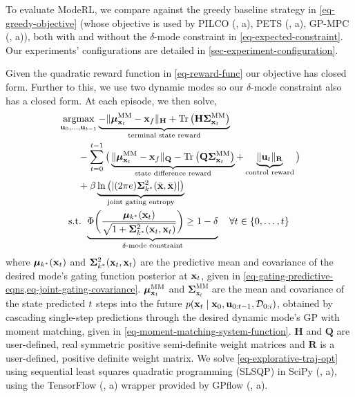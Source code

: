 \documentclass[twoside]{article}
\newcommand{\state}{\ensuremath{\mathbf{x}}}
\newcommand{\control}{\ensuremath{\mathbf{u}}}
\DeclareMathOperator*{\argmax}{argmax}
\begin{document}
To evaluate ModeRL, we compare against the greedy baseline strategy in \cref{eq-greedy-objective}
(whose objective is used by PILCO (, a), PETS (, a), GP-MPC (, a)),
both with and without the \(\delta\text{-mode}\) constraint in \cref{eq-expected-constraint}.
Our experiments' configurations are detailed in \cref{sec-experiment-configuration}.

Given the quadratic reward function in \cref{eq-reward-func} our objective has closed form.
Further to this, we use two dynamic modes so our \(\delta\text{-mode}\) constraint also has a closed form.
At each episode, we then solve,
\begin{subequations} \label{eq-explorative-traj-opt}
\begin{align}
&\argmax_{\action_{0}, \ldots, \action_{\TimeInd-1}}
\underbrace{- \|\bm\mu^{\text{MM}}_{\state_{\TimeInd}} - \targetState \|_{\mathbf{H}}
+\text{Tr} \left(\mathbf{H} \bm\Sigma^{\text{MM}}_{\state_{\TimeInd}} \right)}_{\text{terminal state reward}} \nonumber \\
&\quad\quad - \sum_{\timeInd=0}^{\TimeInd-1} \big(
\underbrace{\|\bm\mu^{\text{MM}}_{\state_{\timeInd}} - \targetState \|_{\mathbf{Q}}
-\text{Tr} \left(\mathbf{Q} \bm\Sigma^{\text{MM}}_{\state_{\timeInd}} \right)}_{\text{state difference reward}}
+ \underbrace{\|\control_{\timeInd} \|_{\mathbf{R}}}_{\text{control reward}}
\big)
\nonumber \\
&\quad\quad + \beta \underbrace{\ln \left( | (2\pi e) \bm\Sigma^2_{\desiredMode}(\bar{\state}, \bar{\state}) | \right)}_{\text{joint gating entropy}} \\
&\quad \text{s.t. } \underbrace{\Phi \bigg( \frac{\bm\mu_{\desiredMode}(\state_{\timeInd})}{\sqrt{1+ \bm\Sigma^2_{\desiredMode}(\state_{\timeInd}, \state_{\timeInd})}} \bigg)
\geq 1-\delta}_{\delta\text{-mode constraint}} \quad \forall \timeInd \in \{ 0, \ldots, \TimeInd \}
\end{align}
\end{subequations}
where \(\bm\mu_{\desiredMode}(\state_{\timeInd})\) and \(\bm\Sigma^{2}_{\desiredMode}(\state_{\timeInd},\state_{\timeInd})\)
are the predictive mean and covariance
of the desired mode's gating function posterior at
\(\state_{\timeInd}\), given in \cref{eq-gating-predictive-eqns,eq-joint-gating-covariance}.
\(\bm\mu^{\text{MM}}_{\state_{\timeInd}}\) and
\(\bm\Sigma^{\text{MM}}_{\state_{t}}\) are the mean and covariance of the state predicted \(t\) steps into the future
\(p(\state_{\timeInd} \mid \state_{0}, \action_{0:\timeInd-1}, \mathcal{D}_{0:i})\), obtained
by cascading single-step predictions through the desired dynamic mode's GP with moment matching, given in \cref{eq-moment-matching-system-function}.
\(\mathbf{H}\) and \(\mathbf{Q}\) are user-defined, real symmetric positive semi-definite
weight matrices and \(\mathbf{R}\) is a user-defined, positive definite weight matrix.
We solve  \cref{eq-explorative-traj-opt}
using sequential least squares quadratic programming (SLSQP) in SciPy (, a),
using the TensorFlow (, a) wrapper provided by GPflow (, a).
\end{document}
